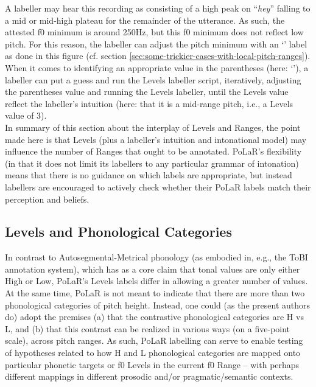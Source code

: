 \documentclass[11pt, twoside]{memoir}
\def\textlabel#1{{\relsize{-.5}\fontspec[Mapping=tex-text]{Roboto Mono}{#1}}}
\def\langtext#1{\textit{#1}}
\begin{document}
A labeller may hear this recording as consisting of a high peak on “\langtext{hey}” falling to a mid or mid-high plateau for the remainder of the utterance. As such, the attested f0 minimum is around 250Hz, but this f0 minimum does not reflect low pitch. For this reason, the labeller can adjust the pitch minimum with an ‘\textlabel{:na}’ label as done in this figure (cf. section \ref{sec:some-trickier-cases-with-local-pitch-ranges}). When it comes to identifying an appropriate value in the parentheses (here: ‘\textlabel{135:na}’), a labeller can put a guess and run the Levels labeller script, iteratively, adjusting the parentheses value and running the Levels labeller, until the Levels value reflect the labeller’s intuition (here: that it is a mid-range pitch, i.e., a Levels value of 3).\\

In summary of this section about the interplay of Levels and Ranges, the point made here is that Levels (plus a labeller’s intuition and intonational model) may influence the number of Ranges that ought to be annotated. PoLaR’s flexibility (in that it does not limit its labellers to any particular grammar of intonation) means that there is no guidance on which labels are appropriate, but instead labellers are encouraged to actively check whether their PoLaR labels match their perception and beliefs.

\subsection{Levels and Phonological Categories}\label{sec:levels-and-phonological-categories}
In contrast to Autosegmental-Metrical phonology (as embodied in, e.g., the ToBI annotation system), which has as a core claim that tonal values are only either High or Low, PoLaR’s Levels labels differ in allowing a greater number of values. At the same time, PoLaR is not meant to indicate that there are more than two phonological categories of pitch height. Instead, one could (as the present authors do) adopt the premises (a) that the contrastive phonological categories are H vs L, and (b) that this contrast can be realized in various ways (on a five-point scale), across pitch ranges. As such, PoLaR labelling can serve to enable testing of hypotheses related to how H and L phonological categories are mapped onto particular phonetic targets or f0 Levels in the current f0 Range – with perhaps different mappings in different prosodic and/or pragmatic\slash semantic contexts.
\end{document}
